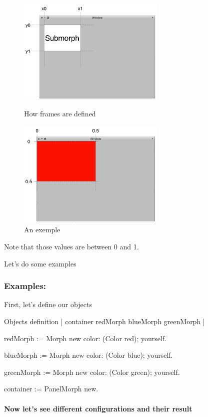 \documentclass[a4paper,10pt,twoside]{book}
\begin{document}
\begin{figure}[ht]\centering
	\includegraphics[width=7cm]{DefaultFrame}
	\caption{How frames are defined}
	\label{fig:defaultFrame}
	\includegraphics[width=7cm]{FrameExplanation}
	\caption{An exemple}
	\label{fig:frameExplanation}
\end{figure}

Note that those values are between 0 and 1.


Let's do some examples

\subsubsection{Examples:}

First, let's define our objects
\begin{code}{Objects definition}
| container redMorph blueMorph greenMorph |

redMorph := Morph new 
				color: (Color red);
				yourself.
				
blueMorph := Morph new 
				color: (Color blue);
				yourself.
				
greenMorph := Morph new 
				color: (Color green);
				yourself.
				
container := PanelMorph new.
\end{code}

\paragraph{Now let's see different configurations and their result}
\end{document}
